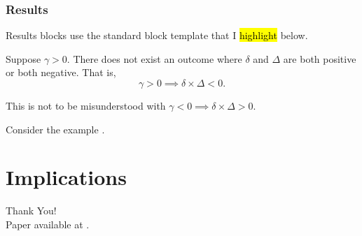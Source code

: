 \documentclass[10pt, mathserif, aspectratio = 169]{beamer}
\begin{document}
\begin{frame}
\frametitle{Results}
Results blocks use the standard block template that I \hl{highlight} below.
\pause
\begin{theorem}
Suppose $\gamma > 0$. There does not exist an outcome where $\delta$ and $\Delta$ are both positive or both negative. That is,
\begin{equation*}
\gamma > 0 \implies \delta \times \Delta < 0.
\end{equation*}
\end{theorem}

\pause

\begin{lemma}
This is not to be misunderstood with $\gamma < 0 \implies \delta \times \Delta > 0$.
\end{lemma}

\pause

\begin{corollary}[An Example]
Consider the example .
\end{corollary}
\end{frame}


\section{Implications}

\begin{frame}[c]
\begin{center}
\textcolor{asumaroon}{\Large{Thank You!}}\\
\vspace{1em}
Paper available at \texttt{}.
\end{center}



\end{frame}
\end{document}
